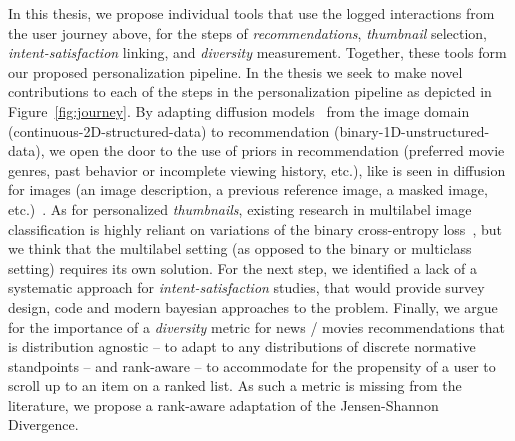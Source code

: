 
In this thesis, we propose individual tools that use the logged interactions from the user journey above, for the steps of \emph{recommendations}, \emph{thumbnail} selection, \emph{intent-satisfaction} linking, and \emph{diversity} measurement. 
Together, these tools form our proposed personalization pipeline. In the thesis we seek to make novel contributions to each of the steps in the personalization pipeline as depicted in Figure~\ref{fig:journey}.
By adapting diffusion models~\cite{jascha} from the image domain (continuous-2D-structured-data) to recommendation (binary-1D-unstructured-data), we open the door to the use of priors in recommendation (preferred movie genres, past behavior or incomplete viewing history, etc.), like is seen in diffusion for images (an image description, a previous reference image, a masked image, etc.)~\cite{diffusionImageSurvey}. As for personalized \emph{thumbnails}, existing research in multilabel image classification is highly reliant on variations of the binary cross-entropy loss~\cite{fisher}, but we think that the multilabel setting (as opposed to the binary or multiclass setting) requires its own solution. For the next step, we identified a lack of a systematic approach for \emph{intent-satisfaction} studies, that would provide survey design, code and modern bayesian approaches to the problem. 
Finally, we argue for the importance of a \emph{diversity} metric for news / movies recommendations that is distribution agnostic -- to adapt to any distributions of discrete normative standpoints -- and rank-aware -- to accommodate for the propensity of a user to scroll up to an item on a ranked list. 
As such a metric is missing from the literature, we propose a rank-aware adaptation of the Jensen-Shannon Divergence.


